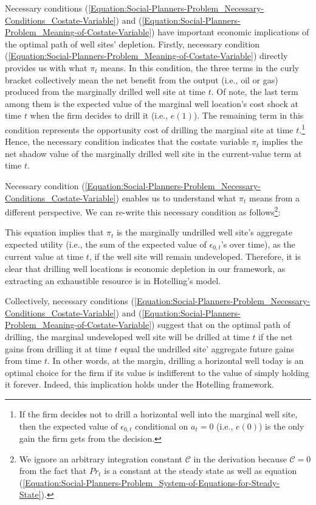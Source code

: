 Necessary conditions (\ref{Equation:Social-Planners-Problem_Necessary-Conditions_Costate-Variable}) and (\ref{Equation:Social-Planners-Problem_Meaning-of-Costate-Variable}) have important economic implications of the optimal path of well sites' depletion. Firstly, necessary condition (\ref{Equation:Social-Planners-Problem_Meaning-of-Costate-Variable}) directly provides us with what $\pi_{t}$ means. In this condition, the three terms in the curly bracket collectively mean the net benefit from the output (i.e., oil or gas) produced from the marginally drilled well site at time $t$. Of note, the last term among them is the expected value of the marginal well location's cost shock at time $t$ when the firm decides to drill it (i.e., $e(1)$). The remaining term in this condition represents the opportunity cost of drilling the marginal site at time $t$.\footnote{If the firm decides not to drill a horizontal well into the marginal well site, then the expected value of $\epsilon_{0,t}$ conditional on $a_{t} = 0$ (i.e., $e(0)$) is the only gain the firm gets from the decision.} Hence, the necessary condition indicates that the costate variable $\pi_{t}$ implies the net shadow value of the marginally drilled well site in the current-value term at time $t$. 

Necessary condition (\ref{Equation:Social-Planners-Problem_Necessary-Conditions_Costate-Variable}) enables us to understand what $\pi_{t}$ means from a different perspective. We can re-write this necessary condition as follows\footnote{We ignore an arbitrary integration constant $\mathcal{C}$ in the derivation because $\mathcal{C} = 0$ from the fact that $Pr_{t}$ is a constant at the steady state as well as equation (\ref{Equation:Social-Planners-Problem_System-of-Equations-for-Steady-State}).}:

This equation implies that $\pi_{t}$ is the marginally undrilled well site's aggregate expected utility (i.e., the sum of the expected value of $\epsilon_{0,t}$'s over time), as the current value at time $t$, if the well site will remain undeveloped. Therefore, it is clear that drilling well locations is economic depletion in our framework, as extracting an exhaustible resource is in Hotelling's model. 

Collectively, necessary conditions (\ref{Equation:Social-Planners-Problem_Necessary-Conditions_Costate-Variable}) and (\ref{Equation:Social-Planners-Problem_Meaning-of-Costate-Variable}) suggest that on the optimal path of drilling, the marginal undeveloped well site will be drilled at time $t$ if the net gains from drilling it at time $t$ equal the undrilled site' aggregate future gains from time $t$. In other words, at the margin, drilling a horizontal well today is an optimal choice for the firm if its value is indifferent to the value of simply holding it forever. Indeed, this implication holds under the Hotelling framework. 

